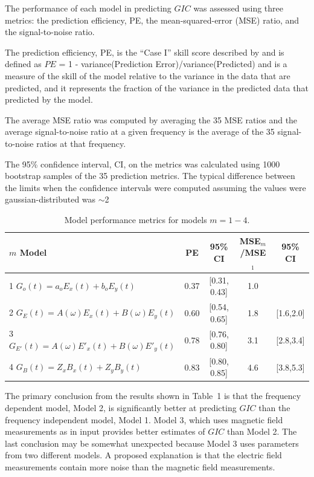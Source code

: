 \documentclass[draft,linenumbers]{agujournal2018}
\begin{document}
The performance of each model in predicting $GIC$ was assessed using three metrics: the prediction efficiency, PE, the mean-squared-error (MSE) ratio, and the signal-to-noise ratio. 

The prediction efficiency, PE, is the ``Case I'' skill score described by \cite{Murphy1988} and is defined as $PE$ = 1 - variance(Prediction Error)/variance(Predicted) and is a measure of the skill of the model relative to the variance in the data that are predicted, and it represents the fraction of the variance in the predicted data that predicted by the model.

The average MSE ratio was computed by averaging the 35 MSE ratios and the average signal-to-noise ratio at a given frequency is the average of the 35 signal-to-noise ratios at that frequency.

The 95\% confidence interval, CI, on the  metrics was calculated using 1000 bootstrap samples of the 35 prediction metrics. The typical difference between the limits when the confidence intervals were computed assuming the values were gaussian-distributed was $\sim$2%

\begin{table}
\caption{Model performance metrics for models $m=1-4$.}
\centering
\begin{tabular}{l c c c c}
\hline
$m$\hspace{1em} Model & PE & 95\% CI & MSE$_m$/MSE$_1$ & 95\% CI\\
\hline
1\hspace{1em} $G_o(t) = a_oE_x(t) + b_oE_y(t)$ & 0.37 & [0.31, 0.43] & 1.0 & \\
2\hspace{1em} $G_E(t) = A(\omega)E_x(t) + B(\omega)E_y(t)$ & 0.60 & [0.54, 0.65] & 1.8 & [1.6,2.0]\\
3\hspace{1em} $G_{E'}(t) = A(\omega)E'_x(t) + B(\omega)E'_y(t)$ & 0.78 & [0.76, 0.80] & 3.1 & [2.8,3.4]\\
4\hspace{1em} $G_{B}(t) = Z_xB_x(t) + Z_yB_y(t)$ & 0.83 & [0.80, 0.85] & 4.6 & [3.8,5.3]\\
\hline
\end{tabular}
\end{table}

The primary conclusion from the results shown in Table~1 is that the frequency dependent model, Model 2, is significantly better at predicting $GIC$ than the frequency independent model, Model 1.
Model 3, which uses magnetic field measurements as in input provides better estimates of $GIC$ than Model 2. The last conclusion may be somewhat unexpected because Model 3 uses parameters from two different models. A proposed explanation is that the electric field measurements contain more noise than the magnetic field measurements.
\end{document}
